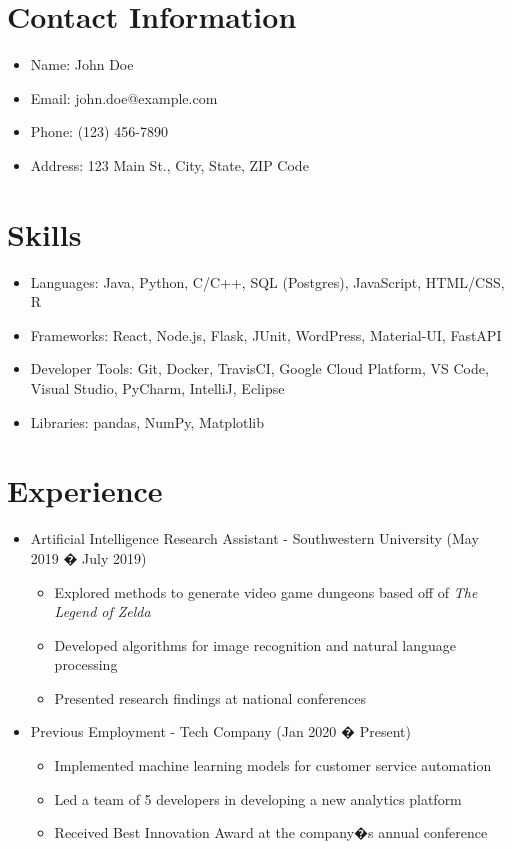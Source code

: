 \section{Contact Information}
\begin{itemize}[leftmargin=0.15in, label={}]
    \item Name: John Doe
    \item Email: john.doe@example.com
    \item Phone: (123) 456-7890
    \item Address: 123 Main St., City, State, ZIP Code
\end{itemize}

\section{Skills}
\begin{itemize}[leftmargin=0.15in, label={}]
    \item Languages: Java, Python, C/C++, SQL (Postgres), JavaScript, HTML/CSS, R
    \item Frameworks: React, Node.js, Flask, JUnit, WordPress, Material-UI, FastAPI
    \item Developer Tools: Git, Docker, TravisCI, Google Cloud Platform, VS Code, Visual Studio, PyCharm, IntelliJ, Eclipse
    \item Libraries: pandas, NumPy, Matplotlib
\end{itemize}

\section{Experience}
\begin{itemize}[leftmargin=0.15in]
    \item Artificial Intelligence Research Assistant - Southwestern University (May 2019 � July 2019)
        \begin{itemize}[leftmargin=0.15in]
            \item Explored methods to generate video game dungeons based off of \emph{The Legend of Zelda}
            \item Developed algorithms for image recognition and natural language processing
            \item Presented research findings at national conferences
        \end{itemize}

    \item Previous Employment - Tech Company (Jan 2020 � Present)
        \begin{itemize}[leftmargin=0.15in]
            \item Implemented machine learning models for customer service automation
            \item Led a team of 5 developers in developing a new analytics platform
            \item Received Best Innovation Award at the company�s annual conference
        \end{itemize}
\end{itemize}

